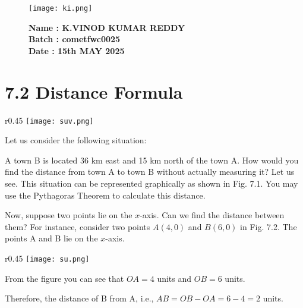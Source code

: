 \documentclass[11pt]{article}
\begin{document}
\begin{figure}[H]
    \begin{minipage}{0.45\textwidth}
        \texttt{[image: ki.png]}
    \end{minipage}\hfill
    \begin{minipage}{0.45\textwidth}
        \textbf{Name : K.VINOD KUMAR REDDY} \\
        \textbf{Batch : cometfwc0025} \\
        \textbf{Date : 15th MAY 2025}
    \end{minipage}
\end{figure}

\setcounter{page}{156}

\section{7.2 Distance Formula}

\begin{wrapfigure}{r}{0.45\textwidth}
  \vspace{-20pt}
  \centering
  \texttt{[image: suv.png]}
  \vspace{-10pt}
\end{wrapfigure}

Let us consider the following situation:

A town B is located 36 km east and 15 km north of the town A. How would you find the distance from town A to town B without actually measuring it? Let us see. This situation can be represented graphically as shown in Fig. 7.1. You may use the Pythagoras Theorem to calculate this distance.

Now, suppose two points lie on the \(x\)-axis. Can we find the distance between them? For instance, consider two points \(A(4, 0)\) and \(B(6, 0)\) in Fig. 7.2. The points A and B lie on the \(x\)-axis.

\begin{wrapfigure}{r}{0.45\textwidth}
  \vspace{-20pt}
  \centering
  \texttt{[image: su.png]}
  \vspace{-10pt}
\end{wrapfigure}

From the figure you can see that \(OA = 4\) units and \(OB = 6\) units.

Therefore, the distance of B from A, i.e., \(AB = OB - OA = 6 - 4 = 2\) units.
\end{document}
